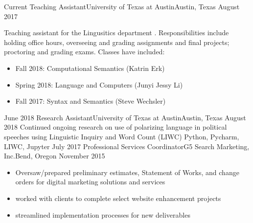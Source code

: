 %
%
%
\begin{experiences}
  \experience
    {Current}   {Teaching Assistant}{University of Texas at Austin}{Austin, Texas}
    {August 2017} { Teaching assistant for the Lingusitics department
. Responsibilities include holding office hours, overseeing and grading assignments and final projects; proctoring and grading exams. Classes have included:
                      \begin{itemize}
                        \item Fall 2018: Computational Semantics (Katrin Erk) 
                        \item Spring 2018: Language and Computers (Junyi Jessy Li)
                        \item Fall 2017: Syntax and Semantics (Steve Wechsler)
                      \end{itemize}
                    }
  \emptySeparator
  \experiencetech
    {June 2018} {Research Assistant}{University of Texas at Austin}{Austin, Texas}
    {August 2018}    { Continued ongoing research on use of polarizing language in political speeches using Linguistic Inquiry and Word Count (LIWC)  }
                    {Python, Pycharm, LIWC, Jupyter}
  \emptySeparator
  \experiencetech
    {July 2017}     {Professional Services Coordinator}{G5 Search Marketing, Inc.}{Bend, Oregon}
    {November 2015}    {
                      \begin{itemize}
                        \item Oversaw/prepared preliminary estimates, Statement of Works, and change orders for digital marketing solutions and services 
                        \item worked with clients to  complete select website enhancement projects 
                        \item streamlined implementation processes for new deliverables


\end{itemize}}
\end{experiences}
